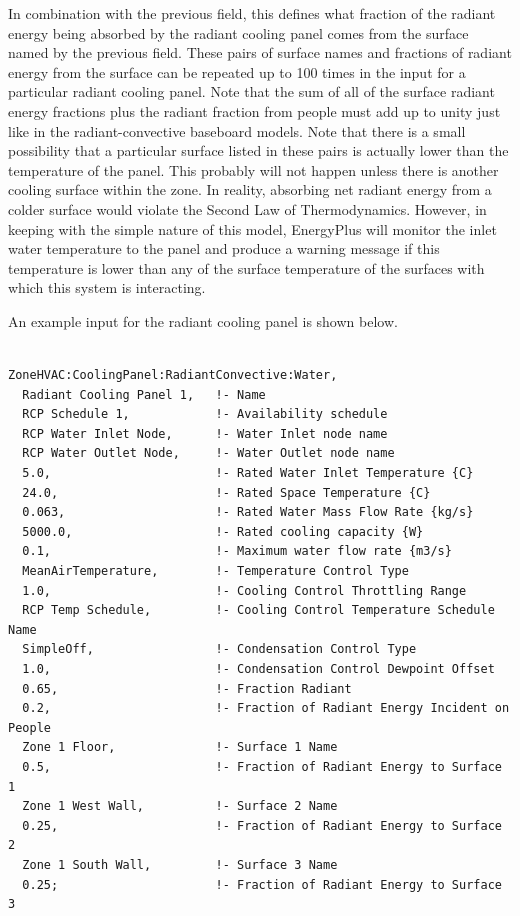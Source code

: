 In combination with the previous field, this defines what fraction of the radiant energy being absorbed by the radiant cooling panel comes from the surface named by the previous field.  These pairs of surface names and fractions of radiant energy from the surface can be repeated up to 100 times in the input for a particular radiant cooling panel.  Note that the sum of all of the surface radiant energy fractions plus the radiant fraction from people must add up to unity just like in the radiant-convective baseboard models.  Note that there is a small possibility that a particular surface listed in these pairs is actually lower than the temperature of the panel.  This probably will not happen unless there is another cooling surface within the zone.  In reality, absorbing net radiant energy from a colder surface would violate the Second Law of Thermodynamics.  However, in keeping with the simple nature of this model, EnergyPlus will monitor the inlet water temperature to the panel and produce a warning message if this temperature is lower than any of the surface temperature of the surfaces with which this system is interacting.

An example input for the radiant cooling panel is shown below.

\begin{lstlisting}

ZoneHVAC:CoolingPanel:RadiantConvective:Water,
  Radiant Cooling Panel 1,   !- Name
  RCP Schedule 1,            !- Availability schedule
  RCP Water Inlet Node,      !- Water Inlet node name
  RCP Water Outlet Node,     !- Water Outlet node name
  5.0,                       !- Rated Water Inlet Temperature {C}
  24.0,                      !- Rated Space Temperature {C}
  0.063,                     !- Rated Water Mass Flow Rate {kg/s}
  5000.0,                    !- Rated cooling capacity {W}
  0.1,                       !- Maximum water flow rate {m3/s}
  MeanAirTemperature,        !- Temperature Control Type
  1.0,                       !- Cooling Control Throttling Range
  RCP Temp Schedule,         !- Cooling Control Temperature Schedule Name
  SimpleOff,                 !- Condensation Control Type
  1.0,                       !- Condensation Control Dewpoint Offset
  0.65,                      !- Fraction Radiant
  0.2,                       !- Fraction of Radiant Energy Incident on People
  Zone 1 Floor,              !- Surface 1 Name
  0.5,                       !- Fraction of Radiant Energy to Surface 1
  Zone 1 West Wall,          !- Surface 2 Name
  0.25,                      !- Fraction of Radiant Energy to Surface 2
  Zone 1 South Wall,         !- Surface 3 Name
  0.25;                      !- Fraction of Radiant Energy to Surface 3
\end{lstlisting}

